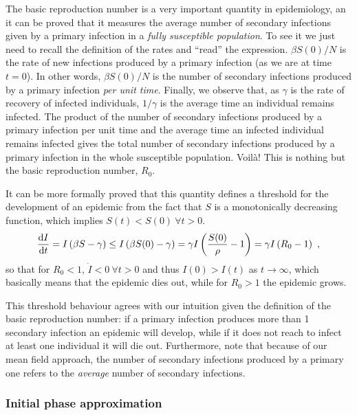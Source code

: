 The basic reproduction number is a very important quantity in
epidemiology, an it can be proved that it measures the average number of
secondary infections given by a primary infection in a \textit{fully
  susceptible population}. To see it we just need to recall the definition of
the rates and ``read'' the expression. $\beta S(0)/N$ is the rate of new
infections produced by a primary infection (as we are at time $t=0$). In other
words, $\beta	S(0)/N$ is the number of secondary infections produced by a
primary infection \textit{per unit time}. Finally, we observe that, as $\gamma$
is the rate of recovery of infected individuals, $1/\gamma$ is the average time
an individual remains infected. The product of the number of secondary
infections produced by a primary infection per unit time and the average time
an infected individual remains infected gives the total number of secondary
infections produced by a primary infection in the whole susceptible population.
Voilà! This is nothing but the basic reproduction number, $R_0$.

It can be more formally proved that this quantity defines a threshold for the
development of an epidemic from the fact that $S$ is a monotonically decreasing
function, which implies $S(t)<S(0) \ \forall t>0$.
\begin{equation}\label{eq: threshold_t}
  \frac{\mathrm{d} I}{\mathrm{d} t}=I\left(\beta S-\gamma\right)\leq I\left(\beta
    S(0)-\gamma\right)=\gamma I\left(\frac{S(0)}{\rho}-1\right)=\gamma
  I\left(R_0-1\right) \
  ,
\end{equation}
so that for $R_0<1$, $\dot{I}<0 \ \forall t>0$ and thus $I(0)>I(t)$ as
$t\to\infty$, which basically means that the epidemic dies out, while for
$R_0>1$ the epidemic grows.

This threshold behaviour agrees with our intuition given the definition of
the basic reproduction number: if a primary infection produces more than 1
secondary infection an epidemic will develop, while if it does not reach to
infect at least one individual it will die out. Furthermore, note that
because of our mean field approach, the number of secondary infections produced
by a primary one refers to the \textit{average} number of secondary
infections.

\subsubsection*{Initial phase approximation}

